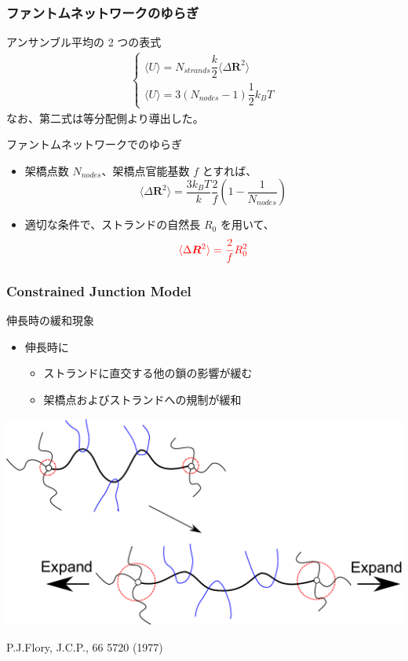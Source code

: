 \documentclass[12pt, dvipdfmx]{beamer}
\begin{document}
\begin{frame}
	\frametitle{ファントムネットワークのゆらぎ}
		\begin{block}{アンサンブル平均の 2 つの表式}
			\scriptsize
			\begin{align*}
				\begin{cases}
					\langle U \rangle = N_{strands} \dfrac{k}{2} \langle \Delta \bm{R}^2 \rangle \\
					\langle U \rangle = 3(N_{nodes}-1) \dfrac{1}{2} k_B T
				\end{cases}
			\end{align*}
			\normalsize
			なお、第二式は等分配側より導出した。
		\end{block}
		\begin{exampleblock}{ファントムネットワークでのゆらぎ}
			\begin{itemize}
				\item 架橋点数 $N_{nodes}$、架橋点官能基数 $f$ とすれば、
					\scriptsize
					\begin{equation*}
					\langle \Delta \bm{R}^2 \rangle = \dfrac{3k_B T}{k} \dfrac{2}{f} \left( 1-\dfrac{1}{N_{nodes}} \right)
					\end{equation*}
					\normalsize
				\item 適切な条件で、ストランドの自然長 $R_0$ を用いて、
					\scriptsize
					\begin{equation*}
					\color{red}
					\langle \Delta \bm{R}^2 \rangle = \dfrac{2}{f} R_0^2
					\end{equation*}
			\end{itemize}
		\end{exampleblock}
\end{frame}


\begin{frame}
    \frametitle{Constrained Junction Model}
	\begin{exampleblock}{伸長時の緩和現象}
		\begin{itemize}
			\item 伸長時に
			\begin{itemize}
				\item ストランドに直交する他の鎖の影響が緩む
				\item 架橋点およびストランドへの規制が緩和
			\end{itemize}
		\end{itemize}
		\begin{center}
			\includegraphics[width=.7\textwidth]{Constrained_Juntion.pdf}

			P.J.Flory, J.C.P., 66 5720 (1977)
		\end{center}
	\end{exampleblock}
\end{frame}		
\end{document}
